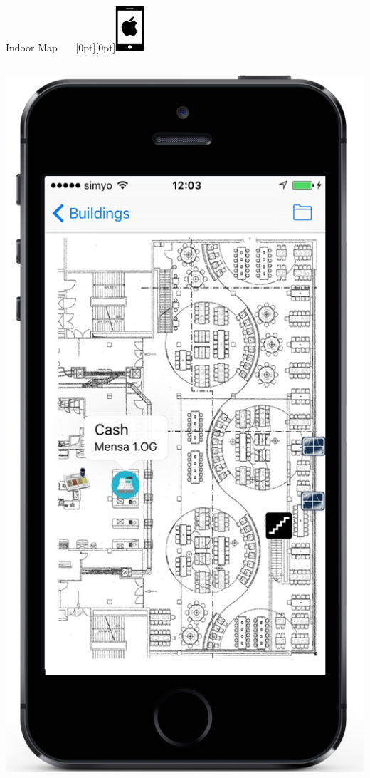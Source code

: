 \documentclass[11pt]{beamer}
\begin{document}
\begin{frame}{Indoor Map ~~~\raisebox{-10pt}[0pt][0pt]{\includegraphics[width=0.08\textwidth]{tech-stack-apple}}}
\begin{columns}[T]
\begin{column}{.4\textwidth}
  \includegraphics[scale=0.25]{mapmensainfo}
  \end{column}
\end{columns}

\end{frame}
\end{document}

